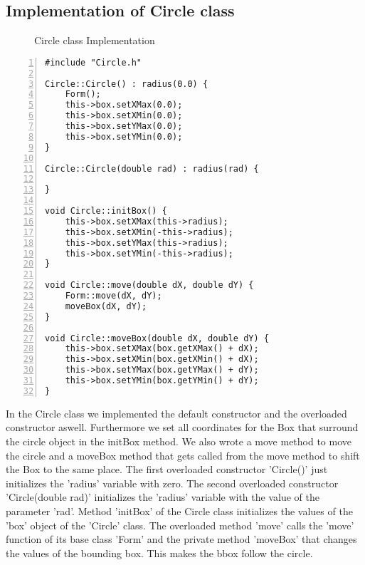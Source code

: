 \documentclass{article}
\begin{document}
\subsection{Implementation of Circle class}
\begin{figure}
\scriptsize{\caption{Circle class Implementation}}
\end{figure}
\begin{lstlisting}[basicstyle=\footnotesize\ttfamily, numbers=left, stepnumber=1, numberstyle = \normalsize, caption={My Caption}]
#include "Circle.h"

Circle::Circle() : radius(0.0) {
	Form();
	this->box.setXMax(0.0);
	this->box.setXMin(0.0);
	this->box.setYMax(0.0);
	this->box.setYMin(0.0);
}

Circle::Circle(double rad) : radius(rad) {

}

void Circle::initBox() {
	this->box.setXMax(this->radius);
	this->box.setXMin(-this->radius);
	this->box.setYMax(this->radius);
	this->box.setYMin(-this->radius);
}

void Circle::move(double dX, double dY) {
	Form::move(dX, dY);
	moveBox(dX, dY);
}

void Circle::moveBox(double dX, double dY) {
	this->box.setXMax(box.getXMax() + dX);
	this->box.setXMin(box.getXMin() + dX);
	this->box.setYMax(box.getYMax() + dY);
	this->box.setYMin(box.getYMin() + dY);
}

\end{lstlisting}
\normalsize{In the Circle class we implemented the default constructor and the overloaded constructor aswell. Furthermore we set all coordinates for the Box that surround the circle object in the initBox method. We also wrote a move method to move the circle and a moveBox method that gets called from the move method to shift the Box to the same place.\newline
\newline
The first overloaded constructor 'Circle()' just initializes the 'radius' variable with zero.
The second overloaded constructor 'Circle(double rad)' initializes the 'radius' variable with the value of the parameter 'rad'.
Method 'initBox' of the Circle class initializes the values of the 'box' object of the 'Circle' class.
The overloaded method 'move' calls the 'move' function of its base class 'Form' and the private method 'moveBox' that changes the values of the bounding box. This makes the bbox follow the circle.
}
\newpage
\end{document}
